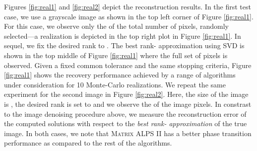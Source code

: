 \documentclass[twocolumn]{svjour3}
\begin{document}
Figures \ref{fig:real1} and \ref{fig:real2} depict the reconstruction results. In the first test case, we use a  grayscale image as shown in the top left corner of Figure \ref{fig:real1}. For this case, we observe only the  of the total number of pixels, randomly selected---a realization is depicted in the top right plot in Figure \ref{fig:real1}. In sequel, we fix the desired rank to . The best rank- approximation using SVD is shown in the top middle of Figure \ref{fig:real1} where the full set of pixels is observed. Given a fixed common tolerance and the same stopping criteria, Figure \ref{fig:real1} shows the recovery performance achieved by a range of algorithms under consideration for 10 Monte-Carlo realizations.  We repeat the same experiment for the second image in Figure \ref{fig:real2}. Here, the size of the image is , the desired rank is set to  and we observe the  of the image pixels. In constrast to the image denoising procedure above, we measure the reconstruction error of the computed solutions with respect to the {\it best rank- approximation} of the true image. In both cases,  we note that \textsc{Matrix ALPS II} has a better phase transition performance as compared to the rest of the algorithms.
\end{document}

